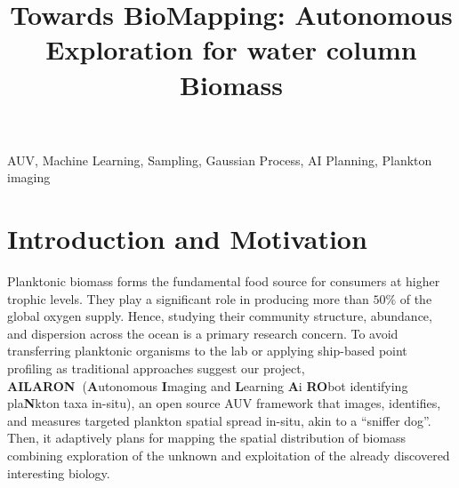 \documentclass[conference]{IEEEtran}
\def\proj{{\textbf{AILARON\ }}}
\begin{document}
\title{Towards BioMapping: Autonomous Exploration for water column Biomass\\
}

\author{
}
\maketitle



\begin{IEEEkeywords}
AUV, Machine Learning, Sampling, Gaussian Process, AI Planning, Plankton imaging
\end{IEEEkeywords}

\section{Introduction and Motivation}

Planktonic biomass forms the fundamental food source for consumers at
higher trophic levels. They play a significant role in producing more
than $50\%$ of the global oxygen supply. Hence, studying their
community structure, abundance, and dispersion across the ocean is a
primary research concern. To avoid transferring planktonic organisms
to the lab or applying ship-based point profiling as traditional
approaches suggest our project,
\proj (\textbf{A}utonomous \textbf{I}maging and \textbf{L}earning \textbf{A}i \textbf{RO}bot identifying pla\textbf{N}kton taxa in-situ),  an open source AUV framework
that images, identifies, and measures targeted plankton spatial spread
in-situ, akin to a ``sniffer dog''.
Then, it adaptively plans for mapping the spatial distribution of biomass combining exploration of the unknown and exploitation of the already discovered interesting biology.
\end{document}
